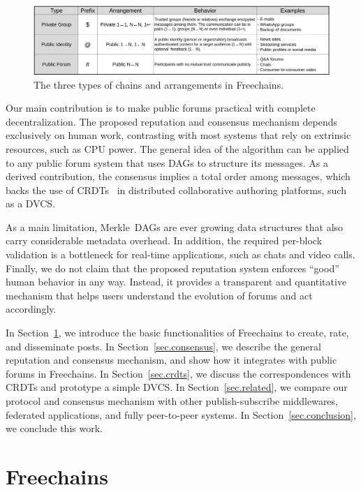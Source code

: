 \documentclass[10pt,journal,compsoc]{IEEEtran}
\newcommand{\FC}       {Freechains\xspace}
\begin{document}
\begin{figure}
\centering
\includegraphics[width=\textwidth]{arrangements.png}
\caption{The three types of chains and arrangements in \FC.}
\label{fig.table}
\end{figure}

Our main contribution is to make public forums practical with complete
decentralization.
The proposed reputation and consensus mechanism depends exclusively on human
work, contrasting with most systems that rely on extrinsic resources, such as
CPU power.
The general idea of the algorithm can be applied to any public forum system
that uses DAGs to structure its messages.
As a derived contribution, the consensus implies a total order among messages,
which backs the use of CRDTs~\cite{p2p.merkle-crdts} in distributed
collaborative authoring platforms, such as a DVCS.

As a main limitation, Merkle~DAGs are ever growing data structures that also
carry considerable metadata overhead.
In addition, the required per-block validation is a bottleneck for real-time
applications, such as chats and video calls.
%
Finally, we do not claim that the proposed reputation system enforces ``good''
human behavior in any way.
Instead, it provides a transparent and quantitative mechanism that helps users
understand the evolution of forums and act accordingly.

In Section~\ref{sec.freechains}, we introduce the basic functionalities of \FC
to create, rate, and disseminate posts.
In Section~\ref{sec.consensus}, we describe the general reputation and
consensus mechanism, and show how it integrates with public forums in \FC.
In Section~\ref{sec.crdts}, we discuss the correspondences with CRDTs and
prototype a simple DVCS.
In Section~\ref{sec.related}, we compare our protocol and consensus mechanism
with other publish-subscribe middlewares, federated applications, and fully
peer-to-peer systems.
In Section~\ref{sec.conclusion}, we conclude this work.

\section{Freechains}
\label{sec.freechains}
\end{document}
